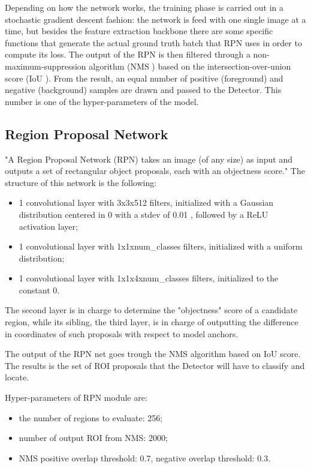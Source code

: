\documentclass[a4paper,10pt]{report}
\begin{document}
Depending on how the network works, the training phase is carried out in a stochastic gradient descent fashion: the network is feed with one single image at a time, but besides the feature extraction backbone there are some specific functions that generate the actual ground truth batch that RPN uses in order to compute its loss. The output of the RPN is then filtered through a non-maximum-suppression algorithm (NMS \cite{nms}) based on the intersection-over-union score (IoU \cite{iou}). From the result, an equal number of positive (foreground) and negative (background) samples are drawn and passed to the Detector. This number is one of the hyper-parameters of the model.

\subsection{Region Proposal Network}\label{subsec:rpn-net}
"A Region Proposal Network (RPN) takes an image (of any size) as input and outputs a set of rectangular object proposals, each with an objectness score." \cite{faster-rcnn}
The structure of this network is the following:
\begin{itemize}
    \item 1 convolutional layer with 3x3x512 filters, initialized with a Gaussian distribution centered in 0 with a stdev of 0.01  \cite{faster-rcnn}, followed by a ReLU activation layer;
    \item 1 convolutional layer with 1x1xnum\_classes filters, initialized with a uniform distribution;
    \item 1 convolutional layer with 1x1x4xnum\_classes filters, initialized to the constant 0.
\end{itemize}

The second layer is in charge to determine the "objectness" score of a candidate region, while its sibling, the third layer, is in charge of outputting the difference in coordinates of such proposals with respect to model anchors.

The output of the RPN net goes trough the NMS algorithm based on IoU score. The results is the set of ROI proposals that the Detector will have to classify and locate.

Hyper-parameters of RPN module are:
\begin{itemize}
    \item the number of regions to evaluate: 256;
    \item number of output ROI from NMS: 2000;
    \item NMS positive overlap threshold: 0.7, negative overlap threshold: 0.3.
\end{itemize}
\end{document}
